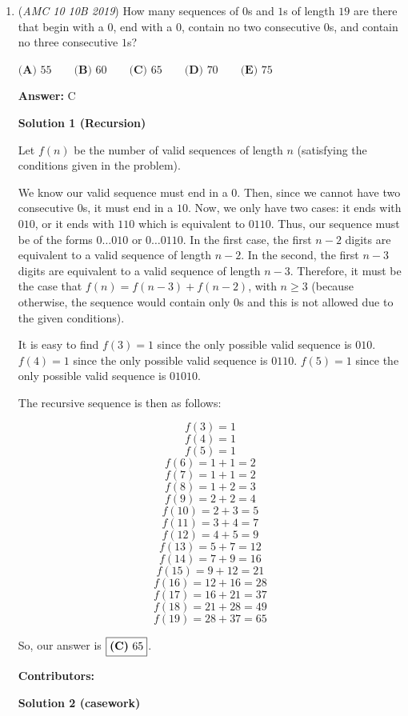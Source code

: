 \begin{enumerate}
 


 


	\item (\textit{AMC 10 10B 2019}) How many sequences of $0$s and $1$s of length $19$ are there that begin with a $0$, end with a $0$, contain no two consecutive $0$s, and contain no three consecutive $1$s?


 $\textbf{(A) }55\qquad\textbf{(B) }60\qquad\textbf{(C) }65\qquad\textbf{(D) }70\qquad\textbf{(E) }75$

 \textbf{Answer: }C



\textbf{Solution 1 (Recursion)}

Let $f(n)$ be the number of valid sequences of length $n$ (satisfying the conditions given in the problem). 

 We know our valid sequence must end in a $0$. Then, since we cannot have two consecutive $0$s, it must end in a $10$. Now, we only have two cases: it ends with $010$, or it ends with $110$ which is equivalent to $0110$. Thus, our sequence must be of the forms $0\ldots010$ or $0\ldots0110$. In the first case, the first $n-2$ digits are equivalent to a valid sequence of length $n-2$. In the second, the first $n-3$ digits are equivalent to a valid sequence of length $n-3$. Therefore, it must be the case that $f(n) = f(n-3) + f(n-2)$, with $n \ge 3$ (because otherwise, the sequence would contain only 0s and this is not allowed due to the given conditions). 

 It is easy to find $f(3) = 1$ since the only possible valid sequence is $010$. $f(4)=1$ since the only possible valid sequence is $0110$. $f(5)=1$ since the only possible valid sequence is $01010$. 

 The recursive sequence is then as follows:

 
 \[f(3)=1\]
 \[f(4)=1\]
 \[f(5) = 1\]
 \[f(6) = 1 + 1 = 2\] 
 \[f(7) = 1 + 1 = 2\]
 \[f(8) = 1 + 2 = 3\] 
 \[f(9) = 2 + 2 = 4\]
 \[f(10) = 2 + 3 = 5\]
 \[f(11) = 3 + 4 = 7\] 
 \[f(12) = 4 + 5 = 9\] 
 \[f(13) = 5 + 7 = 12\]
 \[f(14) = 7 + 9 = 16\] 
 \[f(15) = 9 + 12 = 21\]
 \[f(16) = 12 + 16 = 28\]
 \[f(17) = 16 + 21 = 37\] 
 \[f(18) = 21 + 28 = 49\]
 \[f(19) = 28 + 37 = 65\]

 So, our answer is $\boxed{\text{\textbf{(C)}  } 65}$.

 
\textbf{Contributors:}

 



\textbf{Solution 2 (casework)}


\end{enumerate}

